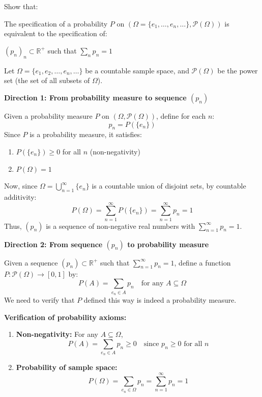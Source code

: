 \documentclass[12pt]{article}
\begin{document}
\section{}
Show that:

The specification of a probability $P$ on $(\Omega = \{e_1, \ldots, e_n, \ldots\}, \mathcal{P}(\Omega))$ is equivalent to the specification of:

$(p_n)_n \subset \mathbb{R}^+$ such that $\sum_n p_n = 1$

\begin{correctionbox}
Let $\Omega = \{e_1, e_2, \ldots, e_n, \ldots\}$ be a countable sample space, and $\mathcal{P}(\Omega)$ be the power set (the set of all subsets of $\Omega$).

\textbf{Direction 1: From probability measure to sequence $(p_n)$}

Given a probability measure $P$ on $(\Omega, \mathcal{P}(\Omega))$, define for each $n$:
\[
p_n = P(\{e_n\})
\]
Since $P$ is a probability measure, it satisfies:
\begin{enumerate}
    \item $P(\{e_n\}) \geq 0$ for all $n$ (non-negativity)
    \item $P(\Omega) = 1$
\end{enumerate}

Now, since $\Omega = \bigcup_{n=1}^\infty \{e_n\}$ is a countable union of disjoint sets, by countable additivity:
\[
P(\Omega) = \sum_{n=1}^\infty P(\{e_n\}) = \sum_{n=1}^\infty p_n = 1
\]
Thus, $(p_n)$ is a sequence of non-negative real numbers with $\sum_{n=1}^\infty p_n = 1$.

\textbf{Direction 2: From sequence $(p_n)$ to probability measure}

Given a sequence $(p_n) \subset \mathbb{R}^+$ such that $\sum_{n=1}^\infty p_n = 1$, define a function $P: \mathcal{P}(\Omega) \to [0,1]$ by:
\[
P(A) = \sum_{e_n \in A} p_n \quad \text{for any } A \subseteq \Omega
\]
We need to verify that $P$ defined this way is indeed a probability measure.

\textbf{Verification of probability axioms:}

\begin{enumerate}
    \item \textbf{Non-negativity:} For any $A \subseteq \Omega$,
    \[
    P(A) = \sum_{e_n \in A} p_n \geq 0 \quad \text{since } p_n \geq 0 \text{ for all } n
    \]
    
    \item \textbf{Probability of sample space:}
    \[
    P(\Omega) = \sum_{e_n \in \Omega} p_n = \sum_{n=1}^\infty p_n = 1
    \]
    

\end{enumerate}
\end{correctionbox}
\end{document}
